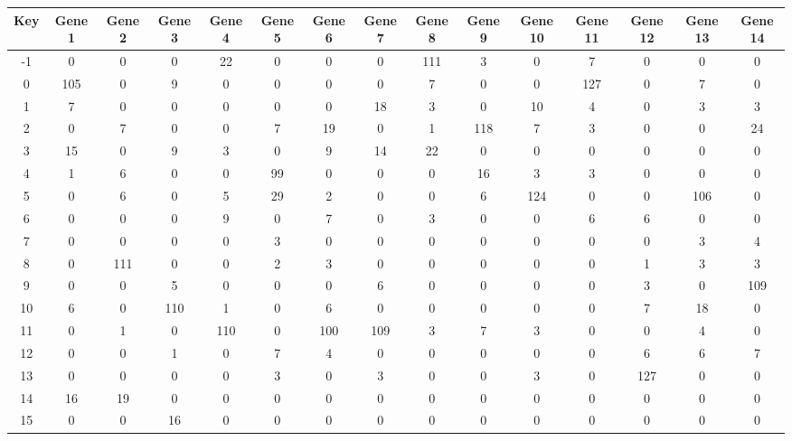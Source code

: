 \begin{tabular}{|c|c|c|c|c|c|c|c|c|c|c|c|c|c|c|}
\hline
Key & Gene 1 & Gene 2 & Gene 3 & Gene 4 & Gene 5 & Gene 6 & Gene 7 & Gene 8 & Gene 9 & Gene 10 & Gene 11 & Gene 12 & Gene 13 & Gene 14 \\
\hline
-1 & 0 & 0 & 0 & 22 & 0 & 0 & 0 & 111 & 3 & 0 & 7 & 0 & 0 & 0 \\
0 & 105 & 0 & 9 & 0 & 0 & 0 & 0 & 7 & 0 & 0 & 127 & 0 & 7 & 0 \\
1 & 7 & 0 & 0 & 0 & 0 & 0 & 18 & 3 & 0 & 10 & 4 & 0 & 3 & 3 \\
2 & 0 & 7 & 0 & 0 & 7 & 19 & 0 & 1 & 118 & 7 & 3 & 0 & 0 & 24 \\
3 & 15 & 0 & 9 & 3 & 0 & 9 & 14 & 22 & 0 & 0 & 0 & 0 & 0 & 0 \\
4 & 1 & 6 & 0 & 0 & 99 & 0 & 0 & 0 & 16 & 3 & 3 & 0 & 0 & 0 \\
5 & 0 & 6 & 0 & 5 & 29 & 2 & 0 & 0 & 6 & 124 & 0 & 0 & 106 & 0 \\
6 & 0 & 0 & 0 & 9 & 0 & 7 & 0 & 3 & 0 & 0 & 6 & 6 & 0 & 0 \\
7 & 0 & 0 & 0 & 0 & 3 & 0 & 0 & 0 & 0 & 0 & 0 & 0 & 3 & 4 \\
8 & 0 & 111 & 0 & 0 & 2 & 3 & 0 & 0 & 0 & 0 & 0 & 1 & 3 & 3 \\
9 & 0 & 0 & 5 & 0 & 0 & 0 & 6 & 0 & 0 & 0 & 0 & 3 & 0 & 109 \\
10 & 6 & 0 & 110 & 1 & 0 & 6 & 0 & 0 & 0 & 0 & 0 & 7 & 18 & 0 \\
11 & 0 & 1 & 0 & 110 & 0 & 100 & 109 & 3 & 7 & 3 & 0 & 0 & 4 & 0 \\
12 & 0 & 0 & 1 & 0 & 7 & 4 & 0 & 0 & 0 & 0 & 0 & 6 & 6 & 7 \\
13 & 0 & 0 & 0 & 0 & 3 & 0 & 3 & 0 & 0 & 3 & 0 & 127 & 0 & 0 \\
14 & 16 & 19 & 0 & 0 & 0 & 0 & 0 & 0 & 0 & 0 & 0 & 0 & 0 & 0 \\
15 & 0 & 0 & 16 & 0 & 0 & 0 & 0 & 0 & 0 & 0 & 0 & 0 & 0 & 0 \\
\hline
\end{tabular}